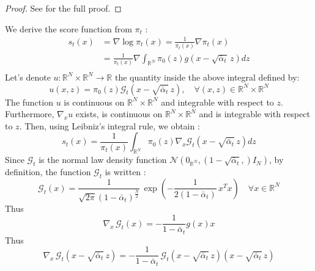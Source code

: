 \documentclass[a4paper,10pt]{article}
\theoremstyle{definition} %
\theoremstyle{definition} %
\theoremstyle{definition} %
\theoremstyle{definition} %
\newcommand{\R}{\mathbb{R}}
\newcommand{\0}{\boldsymbol{0}}
\begin{document}
\begin{proof}
    See  for the full proof.
\end{proof}
We derive the score function from $\pi_t$ :
\begin{align*}
        s_t(x) &= \nabla \log \pi_t(x) = \frac{1}{\pi_t(x)}\nabla\pi_t(x) \\
        &= \frac{1}{\pi_t(x)}\nabla\int_{\R^N} \pi_0(z) g(x - \sqrt{\bar \alpha_t} \,z) dz\\
\end{align*}
Let's denote $u: \R^N \times \R^N \rightarrow \R$ the quantity inside the above integral defined by:
\[u(x,z) =  \pi_0(z) \mathcal{G}_t(x - \sqrt{\bar \alpha_t}\,z), \quad \forall (x,z) \in \R^N \times \R^N\]
The function $u$ is continuous on $\R^N \times \R^N$ and integrable with respect to $z$. Furthermore, $\nabla_x u$ exists, is continuous on $\R^N \times \R^N$ and is integrable with respect to $z$. Then, using Leibniz's integral rule, we obtain :
\begin{equation}\label{eq:score_formule_premilinaire}
    s_t(x) = \frac{1}{\pi_t(x)} \int_{\R^N} \pi_0(z) \nabla_x \mathcal{G}_t(x - \sqrt{\bar \alpha_t} \,z) dz 
\end{equation}
Since $\mathcal{G}_t$ is the normal law density function $\mathcal{N}\left(0_{\R^N}, (1-\sqrt{\bar \alpha _t},)I_N\right)$, by definition, the function $\mathcal{G}_t$ is written :
\begin{equation*}
    \mathcal{G}_t(x) = \frac{1}{\sqrt{2\pi}(1-\bar \alpha_t)^{\frac{N}{2}}} \, \exp\left(-\frac{1}{2(1-\bar \alpha _t)}\,x^Tx\right) \quad \forall x \in \R^N
\end{equation*}
Thus
\begin{equation*}
    \nabla_x \,\mathcal{G}_t(x) = -\frac{1}{1-\bar \alpha_t}g(x)x
\end{equation*}
Thus
\begin{equation*}
    \nabla_x \,\mathcal{G}_t(x - \sqrt{\bar \alpha_t} \,z) = -\frac{1}{1-\bar \alpha_t}\,\mathcal{G}_t(x - \sqrt{\bar \alpha_t} \,z)(x - \sqrt{\bar \alpha_t} \,z)
\end{equation*}
\end{document}
